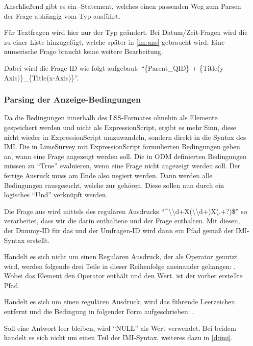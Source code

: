 Anschließend gibt es ein -Statement, welches einen passenden Weg zum Parsen der Frage abhängig vom Typ ausführt.

Für Textfragen wird hier nur der Typ geändert.
Bei Datum/Zeit-Fragen wird die  zu einer Liste hinzugefügt, welche später in \cref{im:ans} gebraucht wird.
Eine numerische Frage braucht keine weitere Bearbeitung.


Dabei wird die Frage-ID wie folgt aufgebaut: \enquote{\{Parent\_QID\} + \{Title(y-Axis)\}\_\{Title(x-Axis)\}}.

\subsubsection{Parsing der Anzeige-Bedingungen}
\label{im:cond}

Da die Bedingungen innerhalb des LSS-Formates ohnehin als Elemente gespeichert werden und nicht als ExpressionScript, ergibt es mehr Sinn, diese nicht wieder in ExpressionScript umzuwandeln, sondern direkt in die Syntax des IMI.
Die in LimeSurvey mit ExpressionScript formulierten Bedingungen geben an, wann eine Frage angezeigt werden soll.
Die in ODM definierten Bedingungen müssen zu \enquote{True} evaluieren, wenn eine Frage nicht angezeigt werden soll.
Der fertige Ausruck muss am Ende also negiert werden.
Dann werden alle Bedingungen rausgesucht, welche zur  gehören.
Diese sollen nun durch ein logisches \enquote{Und} verknüpft werden.

Die Frage aus  wird mittels des regulären Ausdrucks \enquote{\textasciicircum\textbackslash\textbackslash d+X(\textbackslash\textbackslash d+)X(.+?)\$} so verarbeitet, dass wir die darin enthaltene  und  der Frage enthalten.
Mit diesen, der Dummy-ID für das  und der Umfragen-ID wird dann ein Pfad gemäß der IMI-Syntax erstellt.

Handelt es sich nicht um einen Regulären Ausdruck, der als Operator genutzt wird, werden folgende drei Teile in dieser Reihenfolge aneinander gehangen: .
Wobei das Element  den Operator enthält und  den Wert.  ist der vorher erstellte Pfad.

Handelt es sich um einen regulären Ausdruck, wird das führende Leerzeichen entfernt und die Bedingung in folgender Form aufgeschrieben: .

Soll eine Antwort leer bleiben, wird \enquote{NULL} als Wert verwendet.
Bei beidem handelt es sich nicht um einen Teil der IMI-Syntax, weiteres dazu in \cref{d:imi}.

